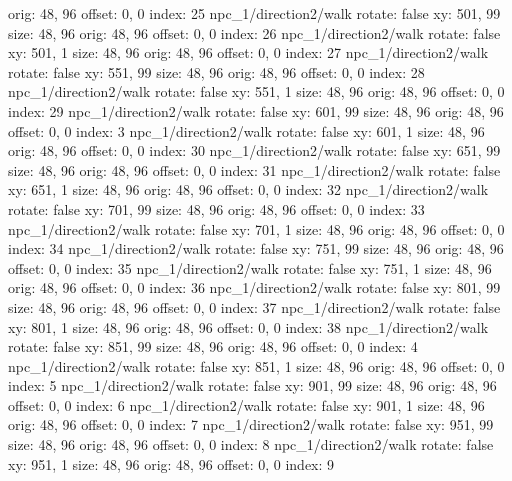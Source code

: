   orig: 48, 96
  offset: 0, 0
  index: 25
npc_1/direction2/walk
  rotate: false
  xy: 501, 99
  size: 48, 96
  orig: 48, 96
  offset: 0, 0
  index: 26
npc_1/direction2/walk
  rotate: false
  xy: 501, 1
  size: 48, 96
  orig: 48, 96
  offset: 0, 0
  index: 27
npc_1/direction2/walk
  rotate: false
  xy: 551, 99
  size: 48, 96
  orig: 48, 96
  offset: 0, 0
  index: 28
npc_1/direction2/walk
  rotate: false
  xy: 551, 1
  size: 48, 96
  orig: 48, 96
  offset: 0, 0
  index: 29
npc_1/direction2/walk
  rotate: false
  xy: 601, 99
  size: 48, 96
  orig: 48, 96
  offset: 0, 0
  index: 3
npc_1/direction2/walk
  rotate: false
  xy: 601, 1
  size: 48, 96
  orig: 48, 96
  offset: 0, 0
  index: 30
npc_1/direction2/walk
  rotate: false
  xy: 651, 99
  size: 48, 96
  orig: 48, 96
  offset: 0, 0
  index: 31
npc_1/direction2/walk
  rotate: false
  xy: 651, 1
  size: 48, 96
  orig: 48, 96
  offset: 0, 0
  index: 32
npc_1/direction2/walk
  rotate: false
  xy: 701, 99
  size: 48, 96
  orig: 48, 96
  offset: 0, 0
  index: 33
npc_1/direction2/walk
  rotate: false
  xy: 701, 1
  size: 48, 96
  orig: 48, 96
  offset: 0, 0
  index: 34
npc_1/direction2/walk
  rotate: false
  xy: 751, 99
  size: 48, 96
  orig: 48, 96
  offset: 0, 0
  index: 35
npc_1/direction2/walk
  rotate: false
  xy: 751, 1
  size: 48, 96
  orig: 48, 96
  offset: 0, 0
  index: 36
npc_1/direction2/walk
  rotate: false
  xy: 801, 99
  size: 48, 96
  orig: 48, 96
  offset: 0, 0
  index: 37
npc_1/direction2/walk
  rotate: false
  xy: 801, 1
  size: 48, 96
  orig: 48, 96
  offset: 0, 0
  index: 38
npc_1/direction2/walk
  rotate: false
  xy: 851, 99
  size: 48, 96
  orig: 48, 96
  offset: 0, 0
  index: 4
npc_1/direction2/walk
  rotate: false
  xy: 851, 1
  size: 48, 96
  orig: 48, 96
  offset: 0, 0
  index: 5
npc_1/direction2/walk
  rotate: false
  xy: 901, 99
  size: 48, 96
  orig: 48, 96
  offset: 0, 0
  index: 6
npc_1/direction2/walk
  rotate: false
  xy: 901, 1
  size: 48, 96
  orig: 48, 96
  offset: 0, 0
  index: 7
npc_1/direction2/walk
  rotate: false
  xy: 951, 99
  size: 48, 96
  orig: 48, 96
  offset: 0, 0
  index: 8
npc_1/direction2/walk
  rotate: false
  xy: 951, 1
  size: 48, 96
  orig: 48, 96
  offset: 0, 0
  index: 9

